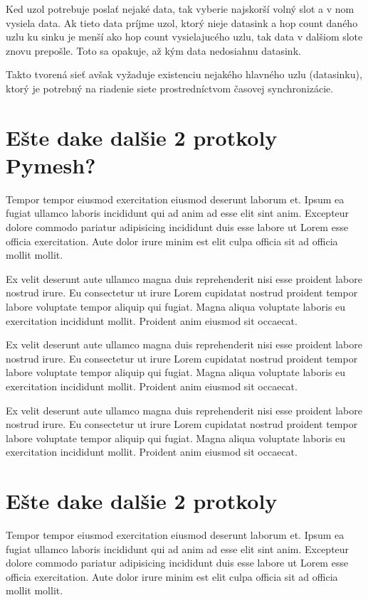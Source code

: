 \documentclass[slovak,master]{diploma}
\begin{document}
Ked uzol potrebuje poslať nejaké data, tak vyberie najskorší volný slot a v nom vysiela data. Ak tieto data príjme uzol, ktorý nieje datasink a 
hop count daného uzlu ku sinku je menší ako hop count vysielajucého uzlu, tak data v dalšiom slote znovu prepošle. Toto sa opakuje, až 
kým data nedosiahnu datasink.

Takto tvorená sieť avšak vyžaduje existenciu nejakého hlavného uzlu (datasinku), ktorý je potrebný na riadenie siete prostredníctvom časovej synchronizácie.

\section{Ešte dake dalšie 2 protkoly Pymesh?}
Tempor tempor eiusmod exercitation eiusmod deserunt laborum et. Ipsum ea fugiat ullamco laboris incididunt qui ad anim ad esse elit sint anim. Excepteur dolore commodo pariatur adipisicing incididunt duis esse labore ut Lorem esse officia exercitation. Aute dolor irure minim est elit culpa officia sit ad officia mollit mollit.

Ex velit deserunt aute ullamco magna duis reprehenderit nisi esse proident labore nostrud irure. Eu consectetur ut irure Lorem cupidatat nostrud proident tempor labore voluptate tempor aliquip qui fugiat. Magna aliqua voluptate laboris eu exercitation incididunt mollit. Proident anim eiusmod sit occaecat.

Ex velit deserunt aute ullamco magna duis reprehenderit nisi esse proident labore nostrud irure. Eu consectetur ut irure Lorem cupidatat nostrud proident tempor labore voluptate tempor aliquip qui fugiat. Magna aliqua voluptate laboris eu exercitation incididunt mollit. Proident anim eiusmod sit occaecat.

Ex velit deserunt aute ullamco magna duis reprehenderit nisi esse proident labore nostrud irure. Eu consectetur ut irure Lorem cupidatat nostrud proident tempor labore voluptate tempor aliquip qui fugiat. Magna aliqua voluptate laboris eu exercitation incididunt mollit. Proident anim eiusmod sit occaecat.
\section{Ešte dake dalšie 2 protkoly}
Tempor tempor eiusmod exercitation eiusmod deserunt laborum et. Ipsum ea fugiat ullamco laboris incididunt qui ad anim ad esse elit sint anim. Excepteur dolore commodo pariatur adipisicing incididunt duis esse labore ut Lorem esse officia exercitation. Aute dolor irure minim est elit culpa officia sit ad officia mollit mollit.
\end{document}
